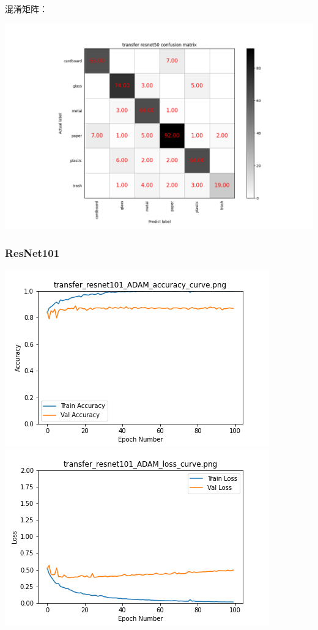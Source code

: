 \documentclass[UTF8]{ctexart}
\begin{document}
混淆矩阵：

\includegraphics[scale=0.5]{cm/res50.png} 

\subsubsection{ResNet101}
 
\includegraphics[scale=0.5]{image/transfer_resnet101_ADAM_accuracy_curve.png} 
\includegraphics[scale=0.5]{image/transfer_resnet101_ADAM_loss_curve.png} 
\end{document}
